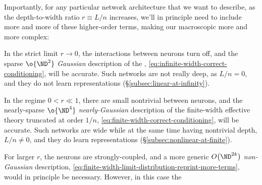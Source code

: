 Importantly, for any particular network architecture that we want to describe, as the depth-to-width ratio $r\equiv L/n$ increases, we'll in principle need to include more and more of these higher-order terms, making our macroscopic  more and more complex:
\bi
\item In the strict limit  $r \to 0$, the interactions between neurons turn off, and the sparse $\o{\ND^2}$ \emph{Gaussian} description of the , \eqref{eq:infinite-width-correct-conditioning},  will be accurate. Such networks are not really deep, as $L/n=0$, and they do not learn representations (\S\ref{subsec:linear-at-infinity}).
\item In the regime $0 < r \ll 1$, there are small nontrivial  between neurons, and the nearly-sparse $\o{\ND^4}$ \emph{nearly-Gaussian} description of the finite-width effective theory truncated at order $1/n$,  \eqref{eq:finite-width-correct-conditioning},  will be accurate. Such networks are wide while at the same time having nontrivial depth, $L/n\neq 0$,  and they do learn representations (\S\ref{subsec:nonlinear-at-finite}).
\item For larger $r$, the neurons are strongly-coupled, and a more generic $O\big(\ND^{2k}\big)$ \emph{non-Gaussian} description, \eqref{eq:finite-width-limit-distribution-reprint-more-terms}, would in principle be necessary. However, in this case the 
